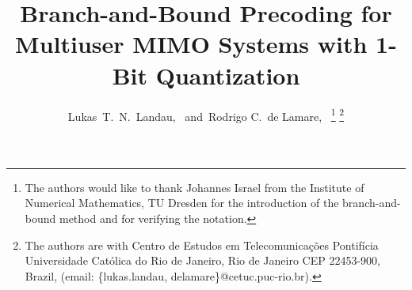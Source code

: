 \documentclass[journal,comsoc]{IEEEtran}
\begin{document}
%
\title{Branch-and-Bound Precoding for Multiuser MIMO Systems with 1-Bit Quantization}

\author{Lukas~T.~N.~Landau,~
        and~Rodrigo C.\ de Lamare,~\vspace{-1em}				
\thanks{The authors would like to thank Johannes Israel from the Institute of Numerical Mathematics, TU Dresden for the introduction of the branch-and-bound method and for verifying the notation.}
\thanks{The authors are with Centro de Estudos em Telecomunica\c{c}\~{o}es Pontif\'{i}cia Universidade Cat\'{o}lica do Rio de Janeiro, Rio de Janeiro CEP 22453-900, Brazil, (email: \{lukas.landau, delamare\}@cetuc.puc-rio.br).} }






% 
\end{document}
